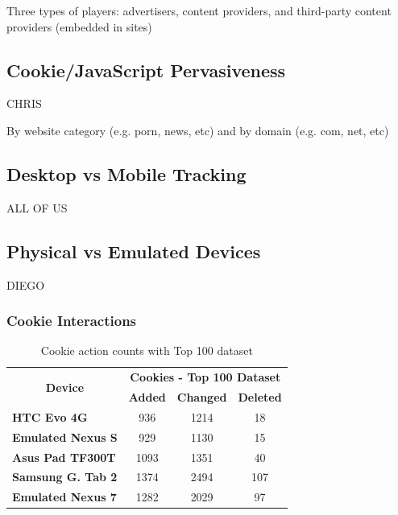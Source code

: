 \documentclass{acm_proc_article-sp}
\begin{document}
Three types of players: advertisers, content providers, and third-party content providers (embedded in sites)

\subsection{Cookie/JavaScript Pervasiveness}
CHRIS

By website category (e.g. porn, news, etc) and by domain (e.g. com, net, etc)

\subsection{Desktop vs Mobile Tracking}
ALL OF US

\subsection{Physical vs Emulated Devices}
DIEGO

\subsubsection{Cookie Interactions}
\begin{table}[htbp]
  \centering
  \caption{Cookie action counts with Top 100 dataset}
    \begin{tabular}{|c|c|c|c|}
    \hline
    \multicolumn{1}{|c|}{\multirow{2}[4]{*}{\textbf{Device}}} & \multicolumn{3}{|c|}{\textbf{Cookies - Top 100 Dataset}} \\ \cline{2-4}
    \multicolumn{1}{|c|}{} & \multicolumn{1}{|c|}{\textbf{Added}} & \multicolumn{1}{|c|}{\textbf{Changed}} & \multicolumn{1}{|c|}{\textbf{Deleted}} \\ \hline
    \multicolumn{1}{|l|}{\textbf{HTC Evo 4G}} & 936   & 1214  & 18 \\
    \multicolumn{1}{|l|}{\textbf{Emulated Nexus S}} & 929   & 1130  & 15 \\
    \multicolumn{1}{|l|}{\textbf{Asus Pad TF300T}} & 1093  & 1351  & 40 \\
    \multicolumn{1}{|l|}{\textbf{Samsung G. Tab 2}} & 1374  & 2494  & 107 \\
    \multicolumn{1}{|l|}{\textbf{Emulated Nexus 7}} & 1282  & 2029  & 97 \\ \hline
    \end{tabular}%
  \label{tab:addlabel}%
\end{table}%
\end{document}
